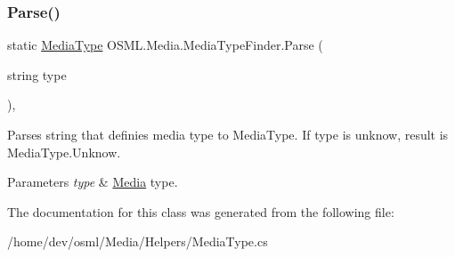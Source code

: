\subsubsection{\texorpdfstring{Parse()}{Parse()}}
{\footnotesize\ttfamily static \mbox{\hyperlink{namespaceOSML_1_1Media_aa3e4261aa5181fcc93920ffe409e8b02}{Media\+Type}} O\+S\+M\+L.\+Media.\+Media\+Type\+Finder.\+Parse (\begin{DoxyParamCaption}\item[{string}]{type }\end{DoxyParamCaption})\hspace{0.3cm}{\ttfamily [inline]}, {\ttfamily [static]}}



Parses string that definies media type to Media\+Type. If type is unknow, result is Media\+Type.\+Unknow. 


\begin{DoxyParams}{Parameters}
{\em type} & \mbox{\hyperlink{classOSML_1_1Media_1_1Media}{Media}} type.\\
\hline
\end{DoxyParams}


The documentation for this class was generated from the following file\+:\begin{DoxyCompactItemize}
\item 
/home/dev/osml/\+Media/\+Helpers/Media\+Type.\+cs\end{DoxyCompactItemize}
